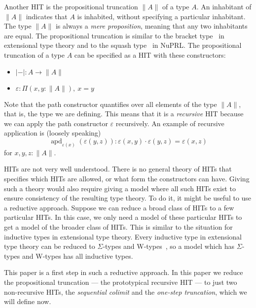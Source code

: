\documentclass[square]{sigplanconf}
\newcommand{\fa}[2]{\ensuremath{\Pi(#1),\ #2}}
\DeclareMathOperator{\myapd}{apd}
\newcommand{\apd}[2]{\ensuremath{\myapd_{#1}(#2)}}
\newcommand{\eps}{\ensuremath{\varepsilon}}
\theoremstyle{definition}
\theoremstyle{remark}
\begin{document}
Another HIT is the propositional truncation $\|A\|$ of a type $A$. An inhabitant of $\|A\|$
indicates that $A$ is inhabited, without specifying a particular inhabitant. The type $\|A\|$ is
always a \emph{mere proposition}, meaning that any two inhabitants are equal. The propositional
truncation is similar to the bracket type~\cite{Awodey2004Propositions} in extensional type theory
and to the squash type~\cite{Constable1986NuPRL} in NuPRL. The propositional truncation of a type
$A$ can be specified as a HIT with these constructors:
\begin{itemize}
  \item $|{-}| : A \to \|A\|$
  \item $\eps : \fa{x, y : \|A\|}{x = y}$
\end{itemize}
Note that the path constructor quantifies over all elements of the type $\|A\|$, that is, the type
we are defining. This means that it is a \emph{recursive} HIT because we can apply the path
constructor $\eps$ recursively. An example of recursive application is (loosely speaking)
\begin{equation}
  \apd{\eps(x)}{\eps(y,z)} : \eps(x,y) \cdot \eps(y,z) = \eps(x,z)\label{eq:epsilon}
\end{equation}
for $x,y,z : \|A\|$.

HITs are not very well understood. There is no general theory of HITs that specifies which HITs are
allowed, or what form the constructors can have. Giving such a theory would also require giving a
model where all such HITs exist to ensure consistency of the resulting type theory. To do it, it
might be useful to use a reductive approach. Suppose we can reduce a broad class of HITs to a few
particular HITs. In this case, we only need a model of these particular HITs to get a model of the
broader class of HITs. This is similar to the situation for inductive types in extensional type
theory. Every inductive type in extensional type theory can be reduced to $\Sigma$-types and
W-types~\cite{Dybjer1997inductivetypes}, so a model which has $\Sigma$-types and W-types has all
inductive types.

This paper is a first step in such a reductive approach. In this paper we reduce the propositional
truncation --- the prototypical recursive HIT --- to just two non-recursive HITs, the
\emph{sequential colimit} and the \emph{one-step truncation}, which we will define now.
\end{document}
